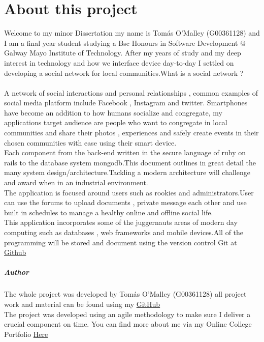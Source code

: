 
\chapter*{About this project}
 
 Welcome to my minor Dissertation my name is Tomás O'Malley (G00361128) and I am a final year student studying  a Bsc Honours in Software Development @ Galway Mayo Institute of Technology. After my years of study and my deep interest in technology and how we interface device day-to-day I settled on developing a social network for local communities.What is a social network ?\\ \\ 
 
 A network of social interactions and personal relationships , common examples of social media platform include Facebook , Instagram and twitter. Smartphones have become an addition to how humans socialize and congregate, my applications target audience are people who want to congregate in local communities and share their photos , experiences and safely create events in their chosen communities with ease using their smart device. \\
 
 Each component from the back-end written in the secure language  of ruby on rails to the database system mongodb.This document outlines in great detail the many system design/architecture.Tackling a modern architecture will challenge and award when in an industrial environment.\\
 
 The application is focused around users such as rookies and administrators.User can use the forums to upload documents , private message each other and use  built in schedules to manage a healthy online and offline social life.\\
 
 This application incorporates some of the juggernauts  areas of modern day computing such as databases , web frameworks and mobile devices.All of the programming will be stored and document using the version control Git at \href{https://github.com/OmalleyTomas98/MinorDissertation}{Github} \\
 
 


\paragraph{Author}
  The whole project was developed by Tomás O'Malley (G00361128) all project work and material can be found using my \href{https://github.com/OmalleyTomas98/MinorDissertation}{GitHub} \\The project was developed using an agile methodology to make sure I deliver a crucial component on time.
 You can find more about me via my Online College Portfolio  \href{https://omalleytomas98.github.io}{Here}


